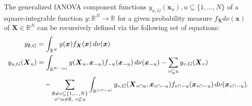 \begin{proposition}
The generalized fANOVA component functions \( y_{u,G}(\boldsymbol{x}_u), u \subseteq \{1,\dots,N\} \) of a square-integrable function $y:\mathbb{R}^N \to \mathbb{R}$ for a given probability measure $f_{\boldsymbol{X}} d\nu(\boldsymbol{x})$ of $\boldsymbol{X} \in \mathbb{R}^N$ can be recursively defined via the following set of equations:
\begin{align}
y_{\emptyset,G} &= \int_{\mathbb{R}^N} y(\boldsymbol{x}) f_{\boldsymbol{X}}(\boldsymbol{x}) \, d \nu(\boldsymbol{x}) \\
y_{u,G}(\boldsymbol{X}_u) &= \int_{\mathbb{R}^{N - |u|}} y(\boldsymbol{X}_u, \boldsymbol{x}_{-u}) f_{-u}(\boldsymbol{x}_{-u}) \, d \nu(\boldsymbol{x}_{-u})
- \sum_{v \subsetneq u} y_{v,G}(\boldsymbol{X}_v) \notag \\
&\quad - \sum_{\substack{\emptyset \ne v \subseteq \{1,\dots,N\} \\ v \cap u \ne \emptyset,\ v \not\subset u}} 
\int_{\mathbb{R}^{|v \cap -u|}} y_{v,G}(\boldsymbol{X}_{v \cap u}, \boldsymbol{x}_{v \cap -u}) f_{v \cap -u}(\boldsymbol{x}_{v \cap -u}) \, d \nu(\boldsymbol{x}_{v \cap -u}).
\end{align}
\label{prop:generalized_fanova_components_rahman}
\end{proposition}



